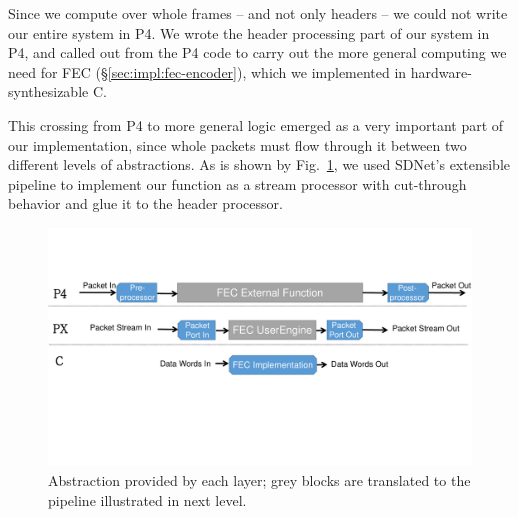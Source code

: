 %
%

         
Since we compute over whole frames -- and not only headers -- we could
not write our entire system in P4. We wrote the header processing part of our
system in P4, and called out from the P4 code to carry out the more general
computing we need for FEC (\S\ref{sec:impl:fec-encoder}),
which we implemented in hardware-synthesizable C.

This crossing from P4 to more general logic emerged as a very important part of our implementation,
since whole packets must flow through it between two different levels
of abstractions.
As is shown by Fig.~\ref{fig:sdnet-interface}, we used SDNet's extensible pipeline to implement
our function as a stream processor with cut-through behavior and glue it
to the header processor.

\begin{figure}
  \centering
  \includegraphics[width=0.4\paperwidth]{figures/sdnet-interface.pdf}
  \caption{\label{fig:sdnet-interface}Abstraction provided by each layer; grey blocks are translated to the pipeline illustrated in next level.}
\end{figure}

